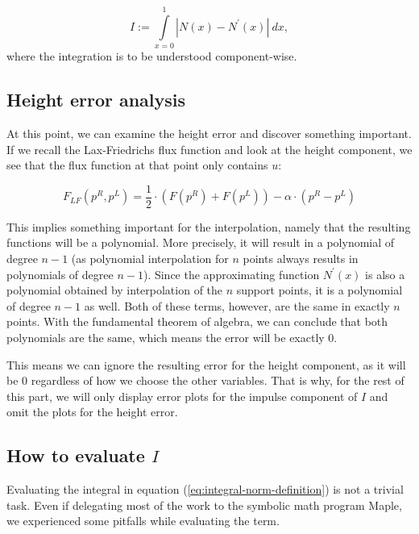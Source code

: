 \documentclass{article}
\begin{document}
\begin{equation}
  \label{eq:integral-norm-definition}
  I := \int\limits_{x=0}^1 | N\left(x\right) - N^\prime\left(x\right) |\  dx,
\end{equation}
where the integration is to be understood component-wise.

\subsection{Height error analysis}
\label{sec:height-error-p2}

At this point, we can examine the height error and discover something important.
If we recall the Lax-Friedrichs flux function and look at the height component, we see that the flux function at that point only contains $u$:

\begin{equation}
  \label{eq:lax-friedrich-definition}
  F_{LF}(p^R,p^L) = \dfrac{1}{2}\cdot (F(p^R) + F(p^L)) - \alpha \cdot (p^R - p^L)
\end{equation}

This implies something important for the interpolation, namely that the resulting functions will be a polynomial.
More precisely, it will result in a polynomial of degree $n-1$ (as polynomial interpolation for $n$ points always results in polynomials of degree $n-1$).
Since the approximating function $N^\prime\left(x\right)$ is also a polynomial obtained by interpolation of the $n$ support points, it is a polynomial of degree $n-1$ as well.
Both of these terms, however, are the same in exactly $n$ points.
With the fundamental theorem of algebra, we can conclude that both polynomials are the same, which means the error will be exactly 0.

This means we can ignore the resulting error for the height component, as it will be 0 regardless of how we choose the other variables.
That is why, for the rest of this part, we will only display error plots for the impulse component of $I$ and omit the plots for the height error.

\subsection{\texorpdfstring{How to evaluate $I$}{How to evaluate I}}
\label{sec:how-to-eval-I}

Evaluating the integral in equation (\ref{eq:integral-norm-definition}) is not a trivial task.
Even if delegating most of the work to the symbolic math program Maple, we experienced some pitfalls while evaluating the term.
\end{document}
